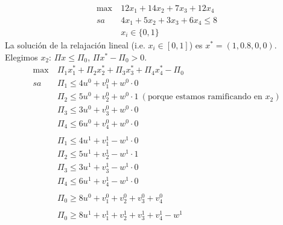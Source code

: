 \documentclass[MIOP.tex]{subfiles}
\begin{document}
\begin{ej}
\begin{align*}
\max\ & 12x_1+14x_2+7x_3+12x_4\\
sa\ & 4x_1+5x_2+3x_3+6x_4\leq 8\\
& x_i\in\{0,1\}
\end{align*}
La solución de la relajación lineal (i.e. $x_i\in[0,1]$) es $x^*=(1, 0.8, 0, 0)$. Elegimos $x_2$: $\Pi x\leq \Pi_0$, $\Pi x^*-\Pi_0>0$. 
\begin{align*}
\max\ & \Pi_1x^*_1+\Pi_2x^*_2+\Pi_3x^*_3+\Pi_4x^*_4-\Pi_0\\
sa\ & \Pi_1\leq 4u^0+v_1^0+w^0\cdot 0\\
& \Pi_2\leq 5u^0+v_2^0+w^0\cdot 1\ (\text{porque estamos ramificando en }x_2)\\
& \Pi_3\leq 3u^0+v_3^0+w^0\cdot 0\\
&\Pi_4\leq 6u^0+v_4^0+w^0\cdot 0\\
\\
& \Pi_1\leq 4u^1+v_1^1-w^1\cdot 0\\
& \Pi_2\leq 5u^1+v_2^1-w^1\cdot 1\\
& \Pi_3\leq 3u^1+v_3^1-w^1\cdot 0\\
&\Pi_4\leq 6u^1+v_4^1-w^1\cdot 0\\
\\
&\Pi_0\geq 8u^0+v_1^0+v_2^0+v_3^0+v_4^0\\
\\
&\Pi_0\geq 8u^1+v_1^1+v_2^1+v_3^1+v_4^1-w^1
\end{align*}
\end{ej}
\end{document}

